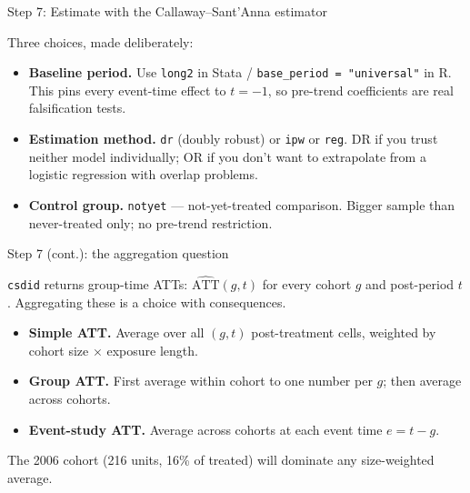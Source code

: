 \documentclass[aspectratio=169,12pt,t]{beamer}
\begin{document}
\begin{frame}{Step 7: Estimate with the Callaway--Sant'Anna estimator}
\vspace{0.4cm}

Three choices, made deliberately:
\vspace{0.3cm}

\begin{itemize}\setlength\itemsep{4pt}
  \item \textbf{Baseline period.} \;Use \texttt{long2} in Stata / \texttt{base\_period = "universal"} in R. \;This pins every event-time effect to $t = -1$, so pre-trend coefficients are real falsification tests.
  \item \textbf{Estimation method.} \;\texttt{dr} (doubly robust) or \texttt{ipw} or \texttt{reg}. \;DR if you trust neither model individually; OR if you don't want to extrapolate from a logistic regression with overlap problems.
  \item \textbf{Control group.} \;\texttt{notyet} --- not-yet-treated comparison. \;Bigger sample than never-treated only; no pre-trend restriction.
\end{itemize}
\end{frame}

\begin{frame}{Step 7 (cont.): the aggregation question}
\vspace{0.4cm}

\texttt{csdid} returns group-time ATTs: \;$\widehat{\text{ATT}}(g, t)$ for every cohort $g$ and post-period $t$. \;Aggregating these is a choice with consequences.

\vspace{0.5cm}

\begin{itemize}\setlength\itemsep{4pt}
  \item \textbf{Simple ATT.} \;Average over all $(g,t)$ post-treatment cells, weighted by cohort size $\times$ exposure length.
  \item \textbf{Group ATT.} \;First average within cohort to one number per $g$; then average across cohorts.
  \item \textbf{Event-study ATT.} \;Average across cohorts at each event time $e = t - g$.
\end{itemize}

\vspace{0.3em}
 \;The 2006 cohort (216 units, 16\% of treated) will dominate any size-weighted average.
\end{frame}
\end{document}
